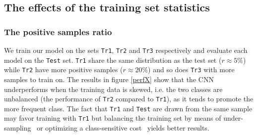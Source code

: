 \documentclass[a4paper]{article}
\begin{document}
    \subsection{The effects of the training set statistics}
        \subsubsection{The positive samples ratio}
       
            We train our model on the sets \texttt{Tr1}, \texttt{Tr2} and \texttt{Tr3} respectively and evaluate each model on the \texttt{Test} set. \texttt{Tr1} share the same distribution as the test set ($r\approx 5\%$) while \texttt{Tr2} have more positive samples ($r\approx 20\%$) and so does \texttt{Tr3} with more samples to train on. The results in figure \ref{perfX} show that the CNN underperforms when the training data is skewed, i.e. the two classes are unbalanced (the performance of \texttt{Tr2} compared to \texttt{Tr1}), as it tends to promote the more frequent class. The fact that \texttt{Tr1} and \texttt{Test} are drawn from the same sample may favor training with \texttt{Tr1} but balancing the training set by means of under-sampling~\cite{drummond2003c4} or optimizing a class-sensitive cost~\cite{NIPS2013_5073}\cite{elkan2001foundations}\cite{zhou2006training} yields better results.
\end{document}
